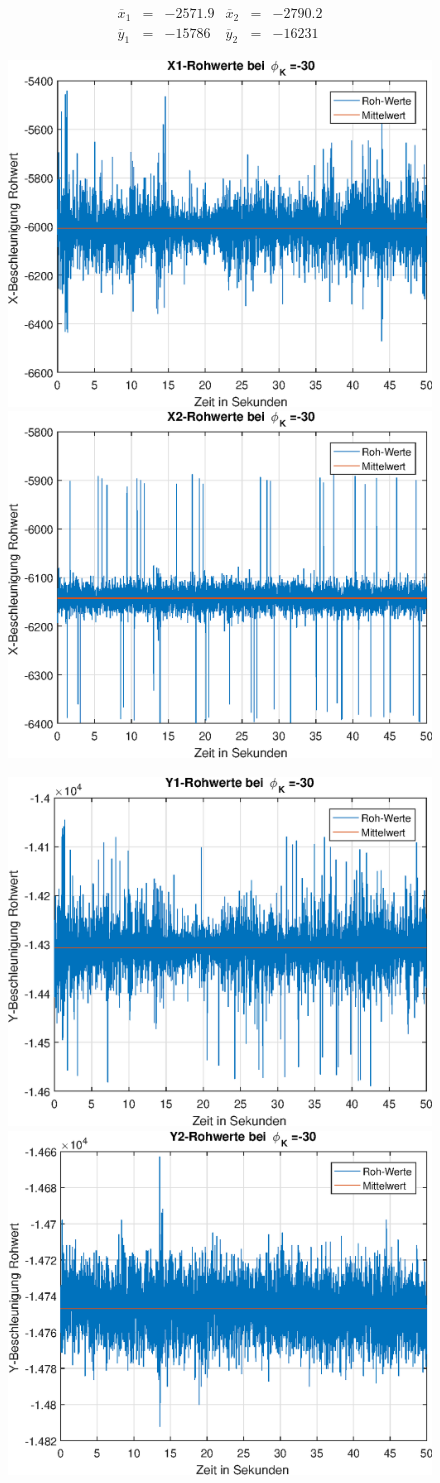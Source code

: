 \documentclass{article}
\begin{document}
\begin{equation}
\begin{array}{lclclcl}
\overline{x}_1 &=& -2571.9 & \overline{x}_2 &=& -2790.2 \\
\overline{y}_1 &=& -15786 & \overline{y}_2 &=& -16231
\end{array}
\end{equation}
\newpage
\begin{figure}[h]
	\includegraphics[width=0.5\linewidth]{img/phiK-30_x1_raw.eps}
	\includegraphics[width=0.5\linewidth]{img/phiK-30_x2_raw.eps}
\end{figure}
\begin{figure}[h]
	\includegraphics[width=0.5\linewidth]{img/phiK-30_y1_raw.eps}
	\includegraphics[width=0.5\linewidth]{img/phiK-30_y2_raw.eps}
\end{figure}
\end{document}
